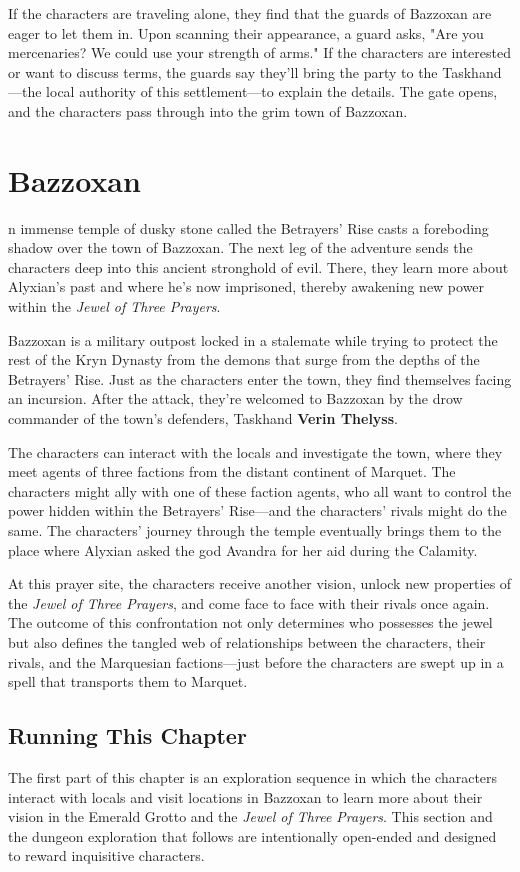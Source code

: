\documentclass[10pt,a4paper,twoside,bg=print,twocolumn,openany,nodeprecatedcode]{dndbook}
\begin{document}
If the characters are traveling alone, they find that the guards of Bazzoxan are eager to let them in. Upon scanning their appearance, a guard asks, "Are you mercenaries? We could use your strength of arms." If the characters are interested or want to discuss terms, the guards say they'll bring the party to the Taskhand—the local authority of this settlement—to explain the details. The gate opens, and the characters pass through into the grim town of Bazzoxan.

\chapter{Bazzoxan}
n immense temple of dusky stone called the Betrayers' Rise casts a foreboding shadow over the town of Bazzoxan. The next leg of the adventure sends the characters deep into this ancient stronghold of evil. There, they learn more about Alyxian's past and where he's now imprisoned, thereby awakening new power within the \textit{Jewel of Three Prayers}.


Bazzoxan is a military outpost locked in a stalemate while trying to protect the rest of the Kryn Dynasty from the demons that surge from the depths of the Betrayers' Rise. Just as the characters enter the town, they find themselves facing an incursion. After the attack, they're welcomed to Bazzoxan by the drow commander of the town's defenders, Taskhand \textbf{Verin Thelyss}.

The characters can interact with the locals and investigate the town, where they meet agents of three factions from the distant continent of Marquet. The characters might ally with one of these faction agents, who all want to control the power hidden within the Betrayers' Rise—and the characters' rivals might do the same. The characters' journey through the temple eventually brings them to the place where Alyxian asked the god Avandra for her aid during the Calamity.

At this prayer site, the characters receive another vision, unlock new properties of the \textit{Jewel of Three Prayers}, and come face to face with their rivals once again. The outcome of this confrontation not only determines who possesses the jewel but also defines the tangled web of relationships between the characters, their rivals, and the Marquesian factions—just before the characters are swept up in a spell that transports them to Marquet.

\section{Running This Chapter}
The first part of this chapter is an exploration sequence in which the characters interact with locals and visit locations in Bazzoxan to learn more about their vision in the Emerald Grotto and the \textit{Jewel of Three Prayers}. This section and the dungeon exploration that follows are intentionally open-ended and designed to reward inquisitive characters.
\end{document}
